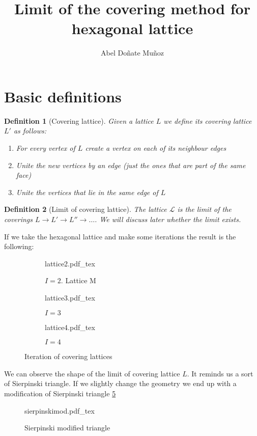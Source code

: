 \documentclass[leqno]{article}
\title{Limit of the covering method for hexagonal lattice}
\author{Abel Doñate Muñoz}
\date{}
\newtheorem*{definition}{Definition}
\newcommand{\incfig}[1]{%
\center
\def\svgwidth{0.9\columnwidth}
{#1.pdf_tex}
}
\begin{document}
\maketitle
\tableofcontents
\newpage

\section{Basic definitions}
\begin{definition}[Covering lattice]
Given a lattice $L$ we define its covering lattice $L'$ as follows:
 \begin{enumerate}[topsep=-6pt, itemsep=0pt]
   \item For every vertex of $L$ create a vertex on each of its neighbour edges
   \item Unite the new vertices by an edge (just the ones that are part of the same face)
   \item Unite the vertices that lie in the same edge of $L$
\end{enumerate}
\end{definition}

\begin{definition}[Limit of covering lattice]
The lattice $\mathcal{L}$ is the limit of the coverings $L \to  L' \to L'' \to \ldots$. We will discuss later whether the limit exists.
\end{definition}

If we take the hexagonal lattice and make some iterations the result is the following:
\begin{figure}[h!]
     \centering
     \begin{subfigure}[b]{0.3\textwidth}
         \centering
		 \incfig{lattice2}
         \caption{$I=2$. Lattice M}
         \label{fig:I2}
     \end{subfigure}
     \hfill
     \begin{subfigure}[b]{0.3\textwidth}
         \centering
		 \incfig{lattice3}
         \caption{$I=3$}
         \label{fig:3}
     \end{subfigure}
     \hfill
     \begin{subfigure}[b]{0.3\textwidth}
         \centering
		 \incfig{lattice4}
         \caption{$I=4$}
         \label{fig:five over x}
     \end{subfigure}
        \caption{Iteration of covering lattices}
        \label{fig:4}
\end{figure}


We can observe the shape of the limit of covering lattice $L$. It reminds us a sort of Sierpinski triangle. If we slightly change the geometry we end up with a modification of Sierpinski triangle \ref{fig:sier}


\begin{figure}[h!]
    \centering 
	\incfig{sierpinskimod}
    \caption{Sierpinski modified triangle}
    \label{fig:sier}
\end{figure}
\end{document}
